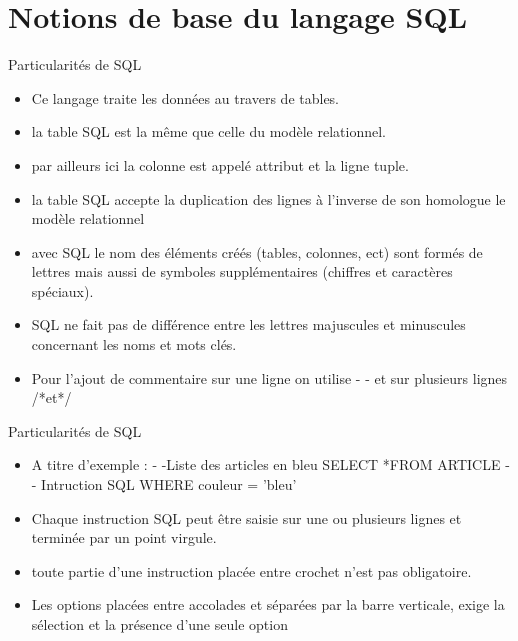 \documentclass{beamer}
\begin{document}
\section{Notions de base du langage SQL}
\begin{frame}{Particularit\'es de SQL}
\begin{itemize}
\item Ce langage traite les donn\'ees au travers de tables.
\item la table SQL est la m\^eme que celle du mod\`ele relationnel.
\item par ailleurs ici la colonne est appel\'e attribut et la ligne tuple.
\item la table SQL accepte la duplication des lignes \`a l'inverse de son homologue le mod\`ele relationnel
\item avec SQL le nom des \'el\'ements cr\'e\'es (tables, colonnes, ect) sont form\'es de lettres mais aussi  de symboles suppl\'ementaires (chiffres et caract\`eres sp\'eciaux).
\item SQL ne fait pas de diff\'erence entre les lettres majuscules et minuscules concernant les noms et mots cl\'es.
\item Pour l'ajout de commentaire sur une ligne on utilise - - et sur plusieurs lignes /*et*/

\end{itemize}
    
\end{frame}
\begin{frame}{Particularit\'es de SQL}
\begin{itemize}
\item A titre d'exemple :
\newline - -Liste des articles en bleu
\newline SELECT *FROM ARTICLE - - Intruction SQL
\newline WHERE couleur = 'bleu'
\item Chaque instruction SQL peut \^etre saisie sur une ou plusieurs lignes et termin\'ee par un point virgule.
\item toute partie d'une instruction plac\'ee entre crochet n'est pas obligatoire.
\item Les options plac\'ees entre accolades et s\'epar\'ees par la barre verticale, exige la s\'election et la pr\'esence d'une seule option
\end{itemize}
\end{frame}
\end{document}
